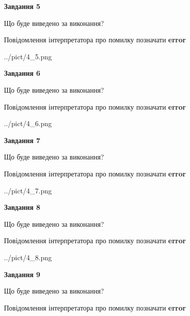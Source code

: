 \documentclass[11pt, ukrainian]{article}
\begin{document}
{\begin {large}
{\begin {center}\textbf{Завдання 5}\end {center}}\par
Що буде виведено за виконання? \par
Повідомлення інтерпретатора про помилку позначати \textbf{error}

\begin{center}
	{../pict/4_5.png}
\end{center}
\newpage

{\begin {center}\textbf{Завдання 6}\end {center}}\par
Що буде виведено за виконання? \par
Повідомлення інтерпретатора про помилку позначати \textbf{error}

\begin{center}
	{../pict/4_6.png}
\end{center}
\newpage

{\begin {center}\textbf{Завдання 7}\end {center}}\par
Що буде виведено за виконання? \par
Повідомлення інтерпретатора про помилку позначати \textbf{error}

\begin{center}
	{../pict/4_7.png}
\end{center}
\newpage

{\begin {center}\textbf{Завдання 8}\end {center}}\par
Що буде виведено за виконання? \par
Повідомлення інтерпретатора про помилку позначати \textbf{error}

\begin{center}
	{../pict/4_8.png}
\end{center}
\newpage

{\begin {center}\textbf{Завдання 9}\end {center}}\par
Що буде виведено за виконання? \par
Повідомлення інтерпретатора про помилку позначати \textbf{error}


\end{large}}
\end{document}
